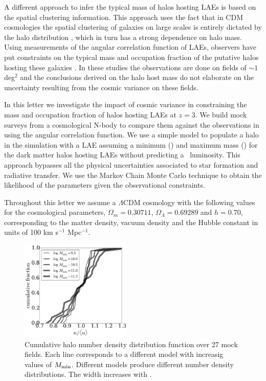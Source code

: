 \documentclass{emulateapj}
\newcommand{\ly}{{\ifmmode{{\rm Ly}\alpha}\else{Ly$\alpha$}\fi}}
\newcommand{\mmin}{{\ifmmode{{M_{\rm min}}}\else{${M_{\rm min}}$}\fi}}
\newcommand{\mmax}{{\ifmmode{{M_{\rm max}}}\else{${M_{\rm max}}$}\fi}}
\begin{document}
A different approach to infer the typical mass of halos hosting
LAEs is based on the spatial clustering information. 
This approach uses the fact
that in CDM cosmologies the spatial clustering of galaxies on large
scales is entirely dictated by the halo distribution
\citep{Colberg00}, which in turn has a strong dependence on halo
mass. 
Using measurements of the angular correlation function of LAEs,
observers have put constraints on the typical mass and occupation
fraction of the putative halos hosting these galaxies
\citep{Hayashino2004,Gawiser07,Nilsson2007,Ouchi2010,Bielby16}. 
In these studies the observations are done on fields of $\sim 1$ deg$^{2}$ and
the conclusions derived on the halo host mass do not elaborate on the uncertainty resulting from the cosmic variance on these fields.

In this letter we investigate the impact of cosmic variance in
constraining the mass and occupation fraction of halos hosting LAEs at $z=3$.
We build mock surveys from a cosmological N-body to compare them against the observations in \cite{Bielby16} using the angular correlation function. 
We use a simple model to populate a halo in the simulation with a LAE   
assuming a minimum (\mmin) and maximum mass (\mmax) for the dark matter halos hosting LAEs without predicting a \ly\  luminosity. 
This approach bypasses all the physical uncertainties associated to star formation and radiative transfer.
We use the Markov Chain Monte Carlo technique to obtain the likelihood of the parameters given the observational constraints.

Throughout this letter we assume a $\Lambda$CDM cosmology with the
following values for the cosmological parameters, $\Omega_{m}=0.30711$,
$\Omega_{\Lambda}=0.69289$ and $h=0.70$, corresponding to the matter
density, vacuum density and the Hubble constant in units of 100 km
s$^{-1}$ Mpc$^{-1}$. 


\begin{figure}
\includegraphics[width=0.47\textwidth]{fig1.pdf}
\caption{Cumulative halo number density distribution function over
  27 mock fields. Each line corresponds to a
  different model with increasig values of $M_{\rm min}$. 
  Different models produce different number density distributions. The
width increases with \mmin. } 
\label{fig:cosmicv0}
\end{figure}
\end{document}
